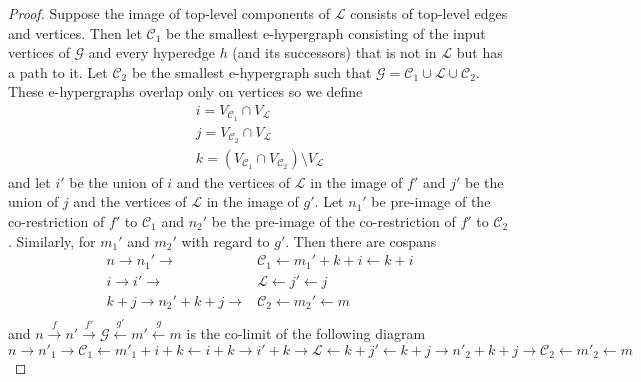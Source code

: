 \begin{proof}
    Suppose the image of top-level components of $\mathcal{L}$ consists of top-level edges and vertices.
    Then let $\mathcal{C}_1$ be the smallest e-hypergraph consisting of the input vertices of $\mathcal{G}$ and every hyperedge $h$ (and its successors) that is not in $\mathcal{L}$ but has a path to it.
    Let $\mathcal{C}_{2}$ be the smallest e-hypergraph such that $\mathcal{G} = \mathcal{C}_{1} \cup \mathcal{L} \cup \mathcal{C}_{2}$.
    These e-hypergraphs overlap only on vertices so we define
    \begin{align*}
        i = V_{\mathcal{C}_{1}} \cap V_{\mathcal{L}}\\
        j = V_{\mathcal{C}_{2}} \cap V_{\mathcal{L}}\\
        k = (V_{\mathcal{C}_{1}} \cap V_{\mathcal{C}_{2}}) \setminus V_{\mathcal{L}}
    \end{align*}
    and let $i'$ be the union of $i$ and the vertices of $\mathcal{L}$ in the image of $f'$ and $j'$ be the union of $j$ and the vertices of $\mathcal{L}$ in the image of $g'$.
    Let $n_{1}'$ be pre-image of the co-restriction of $f'$ to $\mathcal{C}_{1}$ and $n_{2}'$ be the pre-image of the co-restriction of $f'$ to $\mathcal{C}_{2}$.
    Similarly, for $m_{1}'$ and $m_{2}'$ with regard to $g'$.
    Then there are cospans
    \begin{align*}
        n \to n_{1}' \to &\mathcal{C}_{1} \xleftarrow{} m_{1}' + k + i \xleftarrow{} k + i\\
        i \to i' \to &\mathcal{L} \xleftarrow{} j' \xleftarrow{} j\\
        k + j \to n_{2}' + k + j \to &\mathcal{C}_{2} \xleftarrow{} m_{2}' \xleftarrow{} m\\
    \end{align*}
    and $n \xrightarrow{f} n' \xrightarrow{f'} \mathcal{G} \xleftarrow{g'} m' \xleftarrow{g} m$ is the co-limit of the following diagram
    \ifdefined\ONECOLUMN
    \[
    n \xrightarrow{} n'_{1} \xrightarrow{} \mathcal{C}_{1} \xleftarrow{} m'_{1} + i + k \xleftarrow{} i+k \xrightarrow{} i' + k \xrightarrow{} \mathcal{L} \xleftarrow{} k + j' \xleftarrow{} k + j \xrightarrow{} n'_2 + k + j \xrightarrow{} \mathcal{C}_{2} \xleftarrow{} m'_2 \xleftarrow{} m
    \]
    \else

\end{proof}
